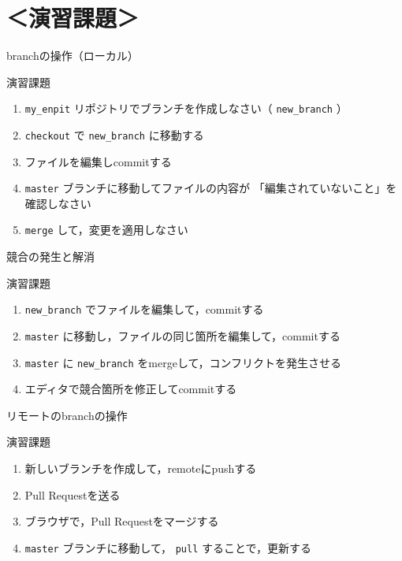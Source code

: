 \documentclass[t, aspectratio=169]{beamer}
\begin{document}
\section{＜演習課題＞}
\label{sec-3-5}
\begin{frame}[fragile,label=sec-3-5-1]{branchの操作（ローカル）}
 \begin{block}{演習課題}
\begin{enumerate}
\item \texttt{my\_enpit} リポジトリでブランチを作成しなさい（ \texttt{new\_branch} ）
\item \texttt{checkout} で \texttt{new\_branch} に移動する
\item ファイルを編集しcommitする
\item \texttt{master} ブランチに移動してファイルの内容が
「編集されていないこと」を確認しなさい
\item \texttt{merge} して，変更を適用しなさい
\end{enumerate}
\end{block}
\end{frame}
\begin{frame}[fragile,label=sec-3-5-2]{競合の発生と解消}
 \begin{block}{演習課題}
\begin{enumerate}
\item \texttt{new\_branch} でファイルを編集して，commitする
\item \texttt{master} に移動し，ファイルの同じ箇所を編集して，commitする
\item \texttt{master} に \texttt{new\_branch} をmergeして，コンフリクトを発生させる
\item エディタで競合箇所を修正してcommitする
\end{enumerate}
\end{block}
\end{frame}
\begin{frame}[fragile,label=sec-3-5-3]{リモートのbranchの操作}
 \begin{block}{演習課題}
\begin{enumerate}
\item 新しいブランチを作成して，remoteにpushする
\item Pull Requestを送る
\item ブラウザで，Pull Requestをマージする
\item \texttt{master} ブランチに移動して， \texttt{pull} することで，更新する
\end{enumerate}
\end{block}
\end{frame}
\end{document}
